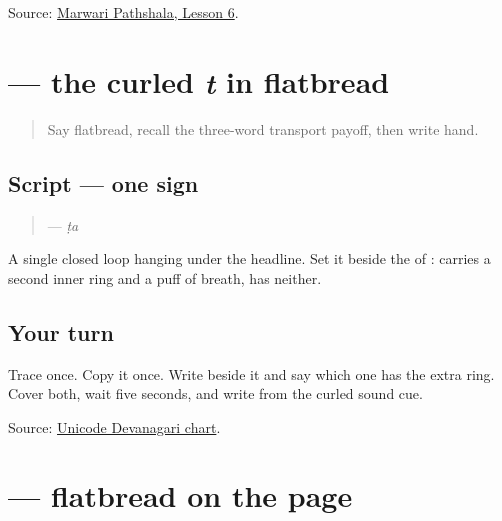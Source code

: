 \begin{tcolorbox}[breakable,colback=teal!4,colframe=teal!35!black,title={Before you move on}]
Source: \href{https://www.marwaripathshala.com/marwari-lesson-6-english}{Marwari Pathshala, Lesson 6}.
\end{tcolorbox}
\section[\texorpdfstring{\mw{ट} (ṭa)}{ट (ṭa)}]{ — the curled \emph{t} in flatbread}

\label{lesson:MW-W19-tta}



\begin{quote}
Say flatbread, recall the three-word transport payoff, then write hand.
\end{quote}

\subsection*{Script — one sign}

\begin{quote}
\textbf{} — \emph{ṭa}
\end{quote}

A single closed loop hanging under the headline. Set it beside the \textbf{} of \textbf{}: \textbf{} carries a second inner ring and a puff of breath, \textbf{} has neither.

\subsection*{Your turn}
Trace \textbf{} once. Copy it once. Write \textbf{} beside it and say which one has the extra ring. Cover both, wait five seconds, and write \textbf{} from the curled sound cue.

\begin{tcolorbox}[breakable,colback=teal!4,colframe=teal!35!black,title={Before you move on}]
Source: \href{https://www.unicode.org/charts/PDF/U0900.pdf}{Unicode Devanagari chart}.
\end{tcolorbox}
\section[\texorpdfstring{\mw{रोटी} (roṭī)}{रोटी (roṭī)}]{ — flatbread on the page}

